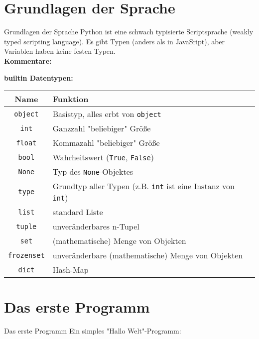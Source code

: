 \section{Grundlagen der Sprache}
\begin{frame}[fragile]{Grundlagen der Sprache}
    Python ist eine schwach typisierte Scriptsprache (weakly typed scripting language). Es gibt Typen (anders als in JavaSript), aber Variablen haben keine festen Typen.\\

    \textbf{Kommentare:}
    
\end{frame}

\begin{frame}[fragile]
	\textbf{builtin Datentypen:}\\
	\begin{tabular}{c|l}
		Name & Funktion \\ \hline
		\texttt{object} & Basistyp, alles erbt von \texttt{object} \\
		\texttt{int} & Ganzzahl "beliebiger" Größe \\
		\texttt{float} & Kommazahl "beliebiger" Größe \\
		\texttt{bool} & Wahrheitswert (\texttt{True}, \texttt{False})\\
		\texttt{None} & Typ des \texttt{None}-Objektes \\
		\texttt{type} & Grundtyp aller Typen (z.B. \texttt{int} ist eine Instanz von \texttt{int}) \\
		\texttt{list} & standard Liste \\
		\texttt{tuple} & unveränderbares n-Tupel \\
		\texttt{set} & (mathematische) Menge von Objekten \\
		\texttt{frozenset} & unveränderbare (mathematische) Menge von Objekten \\
		\texttt{dict} & Hash-Map \\
	\end{tabular}
\end{frame}


\section{Das erste Programm}
\begin{frame}[fragile]{Das erste Programm}
	Ein simples "Hallo Welt"-Programm:\\[.5cm]
	
\end{frame}


